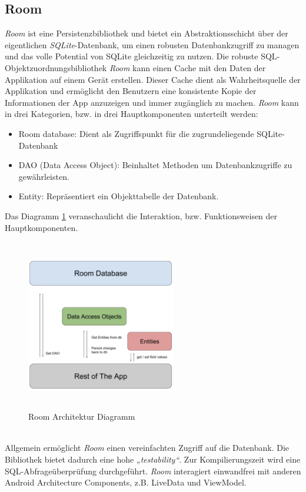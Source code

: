 \subsection*{Room}
\label{sec:Room}
\textit{Room} ist eine Persistenzbibliothek und bietet ein Abstraktionsschicht über der eigentlichen \textit{\acs{SQL}ite}-Datenbank, um einen 
robusten Datenbankzugriff zu managen und das volle Potential von \acs{SQL}ite gleichzeitig zu nutzen. \cite{room.2017}
Die robuste \acs{SQL}-Objektzuordnungsbibliothek \textit{Room} kann einen Cache mit den Daten der Applikation auf einem Gerät erstellen. Dieser 
Cache dient als Wahrheitsquelle der Applikation und ermöglicht den Benutzern eine konsistente Kopie der Informationen der App anzuzeigen 
und immer zugänglich zu machen. \textit{Room} kann in drei Kategorien, bzw. in drei Hauptkomponenten unterteilt werden:
\begin{itemize}
    \item Room database: Dient als Zugriffspunkt für die zugrundeliegende SQLite-Datenbank
    \item DAO (Data Access Object): Beinhaltet Methoden um Datenbankzugriffe zu gewährleisten.
    \item Entity: Repräsentiert ein Objekttabelle der Datenbank.
\end{itemize}
Das Diagramm \ref{pic:roomarchitecturediagramm} veranschaulicht die Interaktion, bzw. Funktionsweisen der Hauptkomponenten.
\begin{figure}[hbt!]
    \centering
    \includegraphics[width=6.5cm,height=7.5cm,keepaspectratio]{2Grundlagen/Bilder/roomArchitecture.png}
    \caption{Room Architektur Diagramm \cite{roomdiagr.2017}}
    \label{pic:roomarchitecturediagramm}
\end{figure}
\\ 
Allgemein ermöglicht \textit{Room} einen vereinfachten Zugriff auf die Datenbank. Die Bibliothek bietet dadurch eine hohe \textit{„testability“}. 
Zur Kompilierungszeit wird eine \acs{SQL}-Abfrageüberprüfung durchgeführt. \textit{Room} interagiert einwandfrei mit anderen Android Architecture 
Components, z.B. LiveData und ViewModel.

